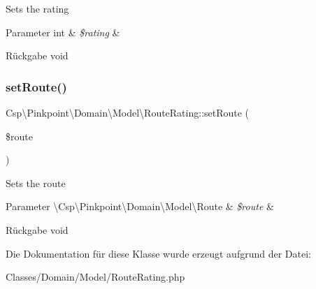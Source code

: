 Sets the rating


\begin{DoxyParams}[1]{Parameter}
int & {\em \$rating} & \\
\hline
\end{DoxyParams}
\begin{DoxyReturn}{Rückgabe}
void 
\end{DoxyReturn}
\mbox{\label{classCsp_1_1Pinkpoint_1_1Domain_1_1Model_1_1RouteRating_a2ab32fd501d76e6c9794828b41b65896}} 
\subsubsection{\texorpdfstring{set\+Route()}{setRoute()}}
{\footnotesize\ttfamily Csp\textbackslash{}\+Pinkpoint\textbackslash{}\+Domain\textbackslash{}\+Model\textbackslash{}\+Route\+Rating\+::set\+Route (\begin{DoxyParamCaption}\item[{}]{\$route }\end{DoxyParamCaption})}

Sets the route


\begin{DoxyParams}[1]{Parameter}
\textbackslash{}\+Csp\textbackslash{}\+Pinkpoint\textbackslash{}\+Domain\textbackslash{}\+Model\textbackslash{}\+Route & {\em \$route} & \\
\hline
\end{DoxyParams}
\begin{DoxyReturn}{Rückgabe}
void 
\end{DoxyReturn}


Die Dokumentation für diese Klasse wurde erzeugt aufgrund der Datei\+:\begin{DoxyCompactItemize}
\item 
Classes/\+Domain/\+Model/Route\+Rating.\+php\end{DoxyCompactItemize}
